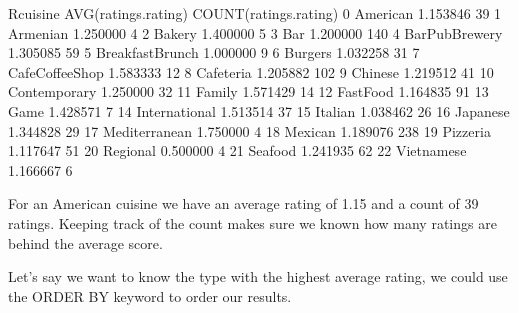 \documentclass[letterpaper,10pt,english]{jupyterBook}
\begin{document}
\begin{sphinxVerbatim}[commandchars=\\\{\}]
            Rcuisine  AVG(ratings.rating)  COUNT(ratings.rating)
0           American             1.153846                     39
1           Armenian             1.250000                      4
2             Bakery             1.400000                      5
3                Bar             1.200000                    140
4    Bar\PYGZus{}Pub\PYGZus{}Brewery             1.305085                     59
5   Breakfast\PYGZhy{}Brunch             1.000000                      9
6            Burgers             1.032258                     31
7   Cafe\PYGZhy{}Coffee\PYGZus{}Shop             1.583333                     12
8          Cafeteria             1.205882                    102
9            Chinese             1.219512                     41
10      Contemporary             1.250000                     32
11            Family             1.571429                     14
12         Fast\PYGZus{}Food             1.164835                     91
13              Game             1.428571                      7
14     International             1.513514                     37
15           Italian             1.038462                     26
16          Japanese             1.344828                     29
17     Mediterranean             1.750000                      4
18           Mexican             1.189076                    238
19          Pizzeria             1.117647                     51
20          Regional             0.500000                      4
21           Seafood             1.241935                     62
22        Vietnamese             1.166667                      6
\end{sphinxVerbatim}

\sphinxAtStartPar
For an American cuisine we have an average rating of 1.15 and a count of 39 ratings.
Keeping track of the count makes sure we known how many ratings are behind the average score.

\sphinxAtStartPar
Let’s say we want to know the type with the highest average rating, we could use the ORDER BY keyword to order our results.

\begin{sphinxVerbatim}[commandchars=\\\{\}]
  
\end{sphinxVerbatim}
\end{document}
